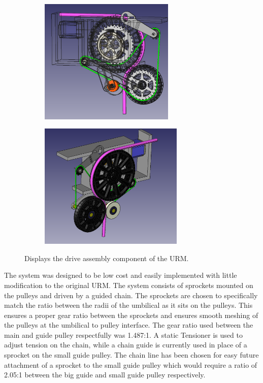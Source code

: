\documentclass[paper=a4, fontsize=11pt]{scrartcl}
\numberwithin{equation}{section}		%
\numberwithin{figure}{section}			%
\numberwithin{table}{section}				%
\begin{document}
\begin{figure}[h]
        \centering
        \begin{subfigure}[h]{0.8\textwidth}
                \includegraphics[height=6cm]{final3}
                \caption{}
				\label{chd1}
        \end{subfigure}%
       \quad
        \begin{subfigure}[h]{0.8\textwidth}
                \includegraphics[height=6cm]{final1}
                \caption{}
                \label{chd2}
        \end{subfigure}
        \quad

        \caption{Displays the drive assembly component of the URM.}
        \label{chd}
\end{figure}
The system was designed to be low cost and easily implemented with little modification to the original URM. The system consists of sprockets mounted on the pulleys and driven by a guided chain. The sprockets are chosen to specifically match the ratio between the radii of the umbilical as it sits on the pulleys. This ensures a proper gear ratio between the sprockets and ensures smooth meshing of the pulleys at the umbilical to pulley interface. The gear ratio used between the main and guide pulley respectfully was 1.487:1. A static Tensioner is used to adjust tension on the chain, while a chain guide is currently used in place of a sprocket on the small guide pulley. The chain line has been chosen for easy future attachment of a sprocket to the small guide pulley which would require a ratio of 2.05:1 between the big guide and small guide pulley respectively.
\end{document}
